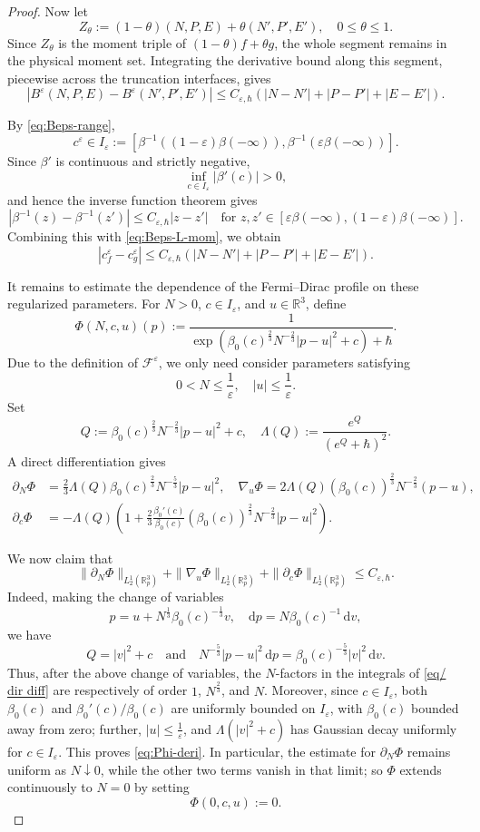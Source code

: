 \documentclass[10pt,reqno]{amsart}
\numberwithin{equation}{section}
\theoremstyle{definition}
\newcommand{\R}{\mathbb R}
\newcommand{\dd}{\mathrm d}
\newcommand{\dpp}{\mathrm{d}p}
\newcommand{\e}{\varepsilon}
\newcommand{\calF}{\mathcal F}
\newcommand{\bq}{\begin{equation}}
\newcommand{\eq}{\end{equation}}
\newcommand{\lt}{\left}
\newcommand{\rt}{\right}
\newcommand{\pa}{\partial}
\begin{document}
\begin{proof}
Now let
\[
 Z_\theta  :=  (1-\theta)(N,P,E)+\theta(N',P',E'),  \quad 0\leq\theta\leq1.
\]
Since $Z_\theta$ is the moment triple of $(1-\theta)f+\theta g$, the whole segment remains in the physical moment set.  Integrating the derivative bound along this segment, piecewise across the truncation interfaces, gives
\bq\label{eq:Beps-L-mom}
 |B^\e(N,P,E)-B^\e(N',P',E')|  \leq C_{\e,\hbar}  \lt(|N-N'|+|P-P'|+|E-E'|\rt).
\eq

By \eqref{eq:Beps-range},
\[
 c^\e\in I_\e  :=  \lt[  \beta^{-1}((1-\e)\beta(-\infty)),  \beta^{-1}(\e\beta(-\infty))  \rt].
\]
Since $\beta'$ is continuous and strictly negative,
\[
 \inf_{c\in I_\e}|\beta'(c)|>0,
\]
and hence the inverse function theorem gives
\[
 |\beta^{-1}(z)-\beta^{-1}(z')|  \leq C_{\e,\hbar}|z-z'| \quad \text{for } z,z'\in[\e\beta(-\infty),(1-\e)\beta(-\infty)].
\]
Combining this with \eqref{eq:Beps-L-mom}, we obtain
\[
 |c_f^\e-c_g^\e|  \leq C_{\e,\hbar}  \lt(  |N-N'|+|P-P'|+|E-E'|  \rt).
\]

It remains to estimate the dependence of the Fermi--Dirac profile on these regularized parameters.  For $N>0$, $c\in I_\e$, and $u\in\R^3$, define
\[
 \Phi(N,c,u)(p)  :=  \frac1{  \exp\lt(\beta_0(c)^{\frac23}N^{-\frac23}|p-u|^2+c\rt)  +\hbar}.
\]
Due to the definition of $\calF^\e$, we only need consider parameters satisfying
\[
 0<N\leq\frac1\e,  \quad  |u|\leq\frac1\e.
\]
Set
\[
 Q  :=  \beta_0(c)^{\frac23}N^{-\frac23}|p-u|^2+c,  \quad  \Lambda(Q)  :=  \frac{e^Q}{(e^Q+\hbar)^2}.
\]
A direct differentiation gives
\begin{equation}\label{eq/ dir diff}
\begin{aligned}
 \pa_N\Phi  &=  \frac23\Lambda(Q)  \beta_0(c)^{\frac23}N^{-\frac53}|p-u|^2,\quad  \nabla_u\Phi  =  2\Lambda(Q)  (\beta_0(c))^{\frac23}N^{-\frac23}(p-u),\\
 \pa_c\Phi  &=  -\Lambda(Q)  \lt(  1+  \frac23\frac{\beta_0'(c)}{\beta_0(c)}  (\beta_0(c))^{\frac23}N^{-\frac23}|p-u|^2  \rt).
\end{aligned}
\end{equation}

We now claim that
\bq \label{eq:Phi-deri}
 \|\pa_N\Phi\|_{L^1_2(\R^3_p)}  +\|\nabla_u\Phi\|_{L^1_2(\R^3_p)}  +\|\pa_c\Phi\|_{L^1_2(\R^3_p)}  \leq C_{\e,\hbar}.
\eq
Indeed, making the change of variables
\[
 p  =  u+N^{\frac13}\beta_0(c)^{-\frac13}v,  \quad  \dpp  =  N\beta_0(c)^{-1}\,\dd v,
\]
we have
\[
 Q=|v|^2+c \quad \text{and} \quad N^{-\frac53} |p-u|^2 \,\dpp = \beta_0(c)^{-\frac{5}{3}} |v|^2 \, \mathrm{d}v.
\]
Thus, after the above change of variables, the $N$-factors in the integrals of \eqref{eq/ dir diff} are respectively of order $1$, $N^{\frac23}$, and $N$. Moreover, since $c\in I_\e$, both $\beta_0(c)$ and $\beta_0'(c)/\beta_0(c)$ are uniformly bounded on $I_\e$, with $\beta_0(c)$ bounded away from zero; further, $|u|\leq\frac1\e$, and $\Lambda(|v|^2+c)$ has Gaussian decay uniformly for $c\in I_\e$. This proves \eqref{eq:Phi-deri}. In particular, the estimate for $\pa_N\Phi$ remains uniform as $N\downarrow0$, while the other two terms vanish in that limit; so $\Phi$ extends continuously to $N=0$ by setting
\[
 \Phi(0,c,u):=0.
\]



\end{proof}
\end{document}
